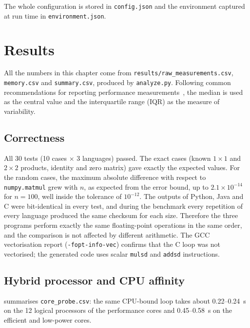 \documentclass[12pt,a4paper]{report}
\begin{document}
The whole configuration is stored in \texttt{config.json} and the environment captured at run time in
\texttt{environment.json}.

\chapter{Results}

All the numbers in this chapter come from \texttt{results/raw\_measurements.csv}, \texttt{memory.csv} and
\texttt{summary.csv}, produced by \texttt{analyze.py}. Following common recommendations for reporting performance
measurements~\cite{hoefler2015}, the median is used as the central value and the interquartile range (IQR) as the
measure of variability.

\section{Correctness}

All 30 tests (10 cases $\times$ 3 languages) passed. The exact cases (known $1\times1$ and $2\times2$ products, identity
and zero matrix) gave exactly the expected values. For the random cases, the maximum absolute difference with respect
to \texttt{numpy.matmul} grew with $n$, as expected from the error bound, up to $2.1 \times 10^{-14}$ for $n = 100$, well
inside the tolerance of $10^{-12}$. The outputs of Python, Java and C were bit-identical in every test, and during the
benchmark every repetition of every language produced the same checksum for each size. Therefore the three programs
perform exactly the same floating-point operations in the same order, and the comparison is not affected by different
arithmetic. The GCC vectorisation report (\texttt{-fopt-info-vec}) confirms that the C loop was not vectorised; the
generated code uses scalar \texttt{mulsd} and \texttt{addsd} instructions.

\section{Hybrid processor and CPU affinity}
\label{sec:hybrid}

 summarises \texttt{core\_probe.csv}: the same CPU-bound loop takes about 0.22--0.24~s on the 12
logical processors of the performance cores and 0.45--0.58~s on the efficient and low-power cores.
\end{document}
